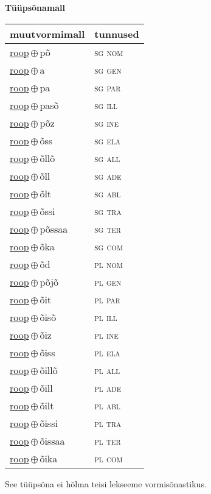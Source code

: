 

\vspace{3.5em}
\noindent \begin{minipage}{\textwidth}
\noindent \textbf{Tüüpsõnamall \,}\\

\begin{sideways}
\begin{tabular}{l l}
muutvormimall & tunnused \\
\hline
\underline{roop}\,$\oplus$\,põ & \textsc{ sg nom } \\
\underline{roop}\,$\oplus$\,a & \textsc{ sg gen } \\
\underline{roop}\,$\oplus$\,pa & \textsc{ sg par } \\
\underline{roop}\,$\oplus$\,pasõ & \textsc{ sg ill } \\
\underline{roop}\,$\oplus$\,põz & \textsc{ sg ine } \\
\underline{roop}\,$\oplus$\,õss & \textsc{ sg ela } \\
\underline{roop}\,$\oplus$\,õllõ & \textsc{ sg all } \\
\underline{roop}\,$\oplus$\,õll & \textsc{ sg ade } \\
\underline{roop}\,$\oplus$\,õlt & \textsc{ sg abl } \\
\underline{roop}\,$\oplus$\,õssi & \textsc{ sg tra } \\
\underline{roop}\,$\oplus$\,põssaa & \textsc{ sg ter } \\
\underline{roop}\,$\oplus$\,õka & \textsc{ sg com } \\
\underline{roop}\,$\oplus$\,õd & \textsc{ pl nom } \\
\underline{roop}\,$\oplus$\,põjõ & \textsc{ pl gen } \\
\underline{roop}\,$\oplus$\,õit & \textsc{ pl par } \\
\underline{roop}\,$\oplus$\,õisõ & \textsc{ pl ill } \\
\underline{roop}\,$\oplus$\,õiz & \textsc{ pl ine } \\
\underline{roop}\,$\oplus$\,õiss & \textsc{ pl ela } \\
\underline{roop}\,$\oplus$\,õillõ & \textsc{ pl all } \\
\underline{roop}\,$\oplus$\,õill & \textsc{ pl ade } \\
\underline{roop}\,$\oplus$\,õilt & \textsc{ pl abl } \\
\underline{roop}\,$\oplus$\,õissi & \textsc{ pl tra } \\
\underline{roop}\,$\oplus$\,õissaa & \textsc{ pl ter } \\
\underline{roop}\,$\oplus$\,õika & \textsc{ pl com } \\
\end{tabular}
\end{sideways}
\label{tab:tüüpsõnamall-rooppõ}

\end{minipage}

 
\vspace{1em}
\noindent See tüüpsõna ei hõlma teisi lekseeme vormi\-sõnastikus.
